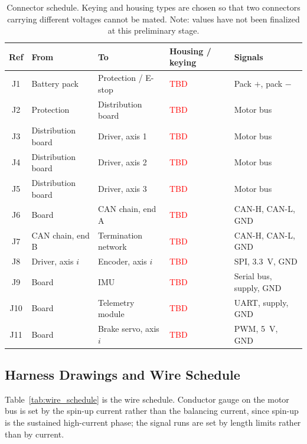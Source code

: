\begin{table}[htbp]
\centering
\caption[Connector schedule]{Connector schedule. Keying and housing types are chosen so that two
connectors carrying different voltages cannot be mated. Note: values have not been finalized at this preliminary stage. }
\label{tab:connectors}
\small
\setlength{\tabcolsep}{4pt}
\begin{tabular}{c L{3.0cm} L{3.0cm} L{2.4cm} L{3.2cm}}
\toprule
Ref & From & To & Housing / keying & Signals \\
\midrule
J1 & Battery pack        & Protection / E-stop   & \textcolor{red}{TBD} & Pack $+$, pack $-$ \\
J2 & Protection          & Distribution board    & \textcolor{red}{TBD} & Motor bus \\
J3 & Distribution board  & Driver, axis 1        & \textcolor{red}{TBD} & Motor bus \\
J4 & Distribution board  & Driver, axis 2        & \textcolor{red}{TBD} & Motor bus \\
J5 & Distribution board  & Driver, axis 3        & \textcolor{red}{TBD} & Motor bus \\
J6 & Board               & CAN chain, end A      & \textcolor{red}{TBD} & CAN-H, CAN-L, GND \\
J7 & CAN chain, end B    & Termination network   & \textcolor{red}{TBD} & CAN-H, CAN-L, GND \\
J8 & Driver, axis $i$    & Encoder, axis $i$     & \textcolor{red}{TBD} & SPI, \qty{3.3}{\volt}, GND \\
J9 & Board               & IMU                   & \textcolor{red}{TBD} & Serial bus, supply, GND \\
J10 & Board              & Telemetry module      & \textcolor{red}{TBD} & UART, supply, GND \\
J11 & Board              & Brake servo, axis $i$ & \textcolor{red}{TBD} & PWM, \qty{5}{\volt}, GND \\
\bottomrule
\end{tabular}
\end{table}

\subsection{Harness Drawings and Wire Schedule}
\label{app:harness}

Table~\ref{tab:wire_schedule} is the wire schedule. Conductor gauge on the motor
bus is set by the spin-up current rather than the balancing current, since
spin-up is the sustained high-current phase; the signal runs are set by length
limits rather than by current.

